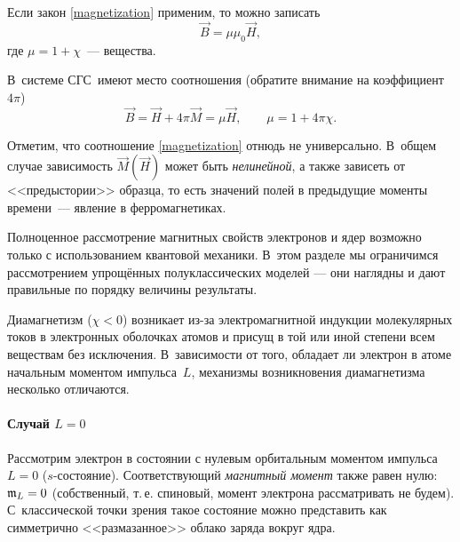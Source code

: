 Если закон \eqref{magnetization} применим,
то можно записать
\begin{equation}
    \vec{B} = \mu\mu_0 \vec{H},
\end{equation}
где $\mu = 1 + \chi$~---  вещества.
\begin{lab:note}
В~системе СГС~имеют место соотношения (обратите внимание на коэффициент
$4\pi$)
\[
\vec{B}=\vec{H}+4\pi\vec{M}=\mu\vec{H},\qquad \mu = 1 + 4\pi \chi.
\]
\end{lab:note}

Отметим, что соотношение \eqref{magnetization} отнюдь не универсально. 
В~общем случае зависимость $\vec{M}(\vec{H})$ может быть \emph{нелинейной}, 
а также зависеть от <<предыстории>> образца, то есть
значений полей в предыдущие моменты времени~---
явление  в ферромагнетиках.


Полноценное рассмотрение магнитных свойств электронов и ядер
возможно только с использованием квантовой механики. 
В~этом разделе мы ограничимся рассмотрением
упрощённых полуклассических моделей --- они
наглядны и дают правильные по порядку величины результаты.

\label{sec:diamagnetism}

Диамагнетизм ($\chi <0$) возникает из-за электромагнитной индукции 
молекулярных токов в электронных оболочках атомов
и присущ в той или иной степени всем веществам без исключения.
В~зависимости от того, обладает ли электрон в атоме начальным моментом
импульса~$L$, механизмы возникновения диамагнетизма несколько
отличаются.

\paragraph{Случай $L=0$}
Рассмотрим электрон в состоянии с нулевым
орбитальным моментом импульса $L=0$ ($s$-состояние). Соответствующий \emph{магнитный
момент} также равен нулю: $\mathfrak{m}_L = 0$ (собственный, т.\,е. спиновый,
момент электрона рассматривать не будем).
С~классической точки зрения такое состояние можно представить как симметрично
<<размазанное>> облако заряда вокруг ядра.

